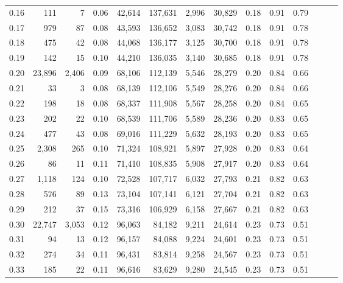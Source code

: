 \begin{tabular}{rrrrrrrrrrrrrr}
0.16 &     111 &      7 &  0.06 &   42,614 &  137,631 &   2,996 &  30,829 &  0.18 &  0.91 &      0.79 \\
0.17 &     979 &     87 &  0.08 &   43,593 &  136,652 &   3,083 &  30,742 &  0.18 &  0.91 &      0.78 \\
0.18 &     475 &     42 &  0.08 &   44,068 &  136,177 &   3,125 &  30,700 &  0.18 &  0.91 &      0.78 \\
0.19 &     142 &     15 &  0.10 &   44,210 &  136,035 &   3,140 &  30,685 &  0.18 &  0.91 &      0.78 \\
0.20 &  23,896 &  2,406 &  0.09 &   68,106 &  112,139 &   5,546 &  28,279 &  0.20 &  0.84 &      0.66 \\
0.21 &      33 &      3 &  0.08 &   68,139 &  112,106 &   5,549 &  28,276 &  0.20 &  0.84 &      0.66 \\
0.22 &     198 &     18 &  0.08 &   68,337 &  111,908 &   5,567 &  28,258 &  0.20 &  0.84 &      0.65 \\
0.23 &     202 &     22 &  0.10 &   68,539 &  111,706 &   5,589 &  28,236 &  0.20 &  0.83 &      0.65 \\
0.24 &     477 &     43 &  0.08 &   69,016 &  111,229 &   5,632 &  28,193 &  0.20 &  0.83 &      0.65 \\
0.25 &   2,308 &    265 &  0.10 &   71,324 &  108,921 &   5,897 &  27,928 &  0.20 &  0.83 &      0.64 \\
0.26 &      86 &     11 &  0.11 &   71,410 &  108,835 &   5,908 &  27,917 &  0.20 &  0.83 &      0.64 \\
0.27 &   1,118 &    124 &  0.10 &   72,528 &  107,717 &   6,032 &  27,793 &  0.21 &  0.82 &      0.63 \\
0.28 &     576 &     89 &  0.13 &   73,104 &  107,141 &   6,121 &  27,704 &  0.21 &  0.82 &      0.63 \\
0.29 &     212 &     37 &  0.15 &   73,316 &  106,929 &   6,158 &  27,667 &  0.21 &  0.82 &      0.63 \\
0.30 &  22,747 &  3,053 &  0.12 &   96,063 &   84,182 &   9,211 &  24,614 &  0.23 &  0.73 &      0.51 \\
0.31 &      94 &     13 &  0.12 &   96,157 &   84,088 &   9,224 &  24,601 &  0.23 &  0.73 &      0.51 \\
0.32 &     274 &     34 &  0.11 &   96,431 &   83,814 &   9,258 &  24,567 &  0.23 &  0.73 &      0.51 \\
0.33 &     185 &     22 &  0.11 &   96,616 &   83,629 &   9,280 &  24,545 &  0.23 &  0.73 &      0.51 \\

\end{tabular}
